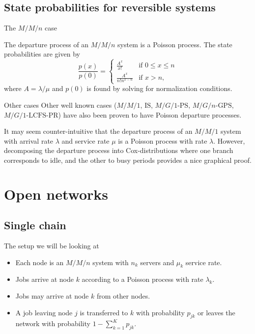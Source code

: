 \documentclass[serif, xcolor={svgnames, table}, usepdftitle=false]{beamer}
\begin{document}
\subsection{State probabilities for reversible systems}

\begin{frame}{The $M/M/n$ case}
  \begin{theorem}[Burke]
    The departure process of an $M/M/n$ system is a Poisson process.  The state
    probabilities are given by
    \begin{equation*}
      \frac{p(x)}{p(0)} =
      \begin{cases}
        \frac{A^x}{x!} & \text{if }0\le x \le n \\
        \frac{A^x}{n! n^{x - n}} & \text{if }x > n\text{,}
      \end{cases}
    \end{equation*}
    where $A = \lambda / {\mu}$ and $p(0)$ is found by solving for normalization
    conditions.
  \end{theorem}
\end{frame}

\begin{frame}{Other cases}
  Other well known cases ($M/M/1$, $\text{IS}$, $M/G/1\text{-PS}$,
  $M/G/n \text{-GPS}$, $M/G/1\text{-LCFS-PR}$) have also been proven to have
  Poisson departure processes.

  \begin{example}[$M/M/1$]
    It may seem counter-intuitive that the departure process of an $M/M/1$
    system with arrival rate $\lambda$ and service rate $\mu$ is a Poisson
    process with rate $\lambda$.  However, decomposing the departure process
    into Cox-distributions where one branch corresponds to idle, and the other
    to busy periods provides a nice graphical proof.
  \end{example}
\end{frame}

\section{Open networks}

\subsection{Single chain}

\begin{frame}{The setup we will be looking at}
  \begin{itemize}
  \item Each node is an $M/M/n$ system with $n_k$ servers and $\mu_k$ service
    rate.
  \item Jobs arrive at node $k$ according to a Poisson process with rate
    $\lambda_k$.
  \item Jobs may arrive at node $k$ from other nodes.
  \item A job leaving node $j$ is transferred to $k$ with probability $p_{j k}$
    or leaves the network with probability $1 - \sum\nolimits_{k = 1}^{K} p_{j
      k}$.
  \end{itemize}
\end{frame}
\end{document}
